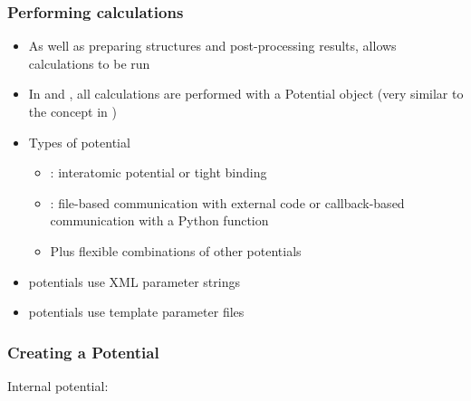 \documentclass[letterpaper,10pt,english]{sphinxmanual}
\begin{document}
\subsubsection{Performing calculations}
\label{\detokenize{potentials:performing-calculations}}\begin{itemize}
\item {} 
As well as preparing structures and post-processing results,
 allows calculations to be run

\item {} 
In  and , all calculations are performed with a
Potential object (very similar to the
 concept in )

\item {} 
Types of potential
\begin{itemize}
\item {} 
: interatomic potential or tight binding

\item {} 
: file-based communication with external code or callback-based communication with a Python function

\item {} 
Plus flexible combinations of other potentials

\end{itemize}

\item {} 
 potentials use XML parameter strings

\item {} 
 potentials use template parameter files

\end{itemize}


\subsubsection{Creating a Potential}
\label{\detokenize{potentials:creating-a-potential}}
Internal potential:

\begin{sphinxVerbatim}[commandchars=\\\{\}]
  
\end{sphinxVerbatim}
\end{document}
